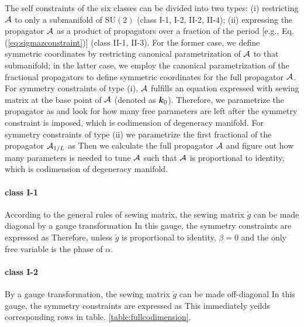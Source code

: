 \documentclass[aps, showpacs, twocolumn, notitlepage, superscriptaddress]{revtex4-1}
\begin{document}
The self constraints of the six classes can be divided into two types: (i) restricting ${\cal A}$ to only a submanifold of $\text{SU}(2)$ (class I-1, I-2, II-2, II-4); (ii) expressing the propagator ${\cal A}$ as a product of propagators over a fraction of the period [e.g., Eq. (\ref{eq:sigmazconstraint})] (class II-1, II-3). For the former case, we define symmetric coordinates by restricting canonical parametrization of ${\cal A}$ to that submanifold; in the latter case, we employ the canonical parametrization of the fractional propagators to define symmetric coordinates for the full propagator ${\cal A}$. For symmetry constraints of type (i), ${\cal A}$ fulfills an equation expressed with sewing matrix at the base point of ${\cal A}$ (denoted as $\boldsymbol{k}_0$). Therefore, we parametrize the propagator as
and look for how many free parameters are left after the symmetry constraint is imposed, which is codimension of degeneracy manifold. For symmetry constraints of type (ii) we parametrize the first fractional of the propagator ${\cal A}_{1/L}$ as
Then we calculate the full propagator ${\cal A}$ and figure out how many parameters is needed to tune ${\cal A}$ such that ${\cal A}$ is proportional to identity, which is codimension of degeneracy manifold.

\paragraph*{class I-1} According to the general rules of sewing matrix, the sewing matrix $\breve{g}$ can be made diagonal by a gauge transformation
In this gauge, the symmetry constraints are expressed as 
Therefore, unless $\breve{g}$ is proportional to identity, $\beta=0$ and the only free variable is the phase of $\alpha$.

\paragraph*{class I-2}
By a gauge transformation, the sewing matrix $\breve{g}$ can be made off-diagonal
In this gauge, the symmetry constraints are expressed as
This immediately yeilds corresponding rows in table. \ref{table:fullcodimension}.
\end{document}
